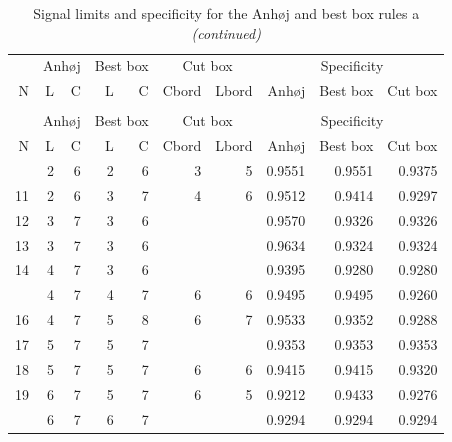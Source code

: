 \begin{Schunk}

\begin{longtable}{rrrrrrrrrr}
\caption{\label{tab:tab1}Signal limits and specificity for the Anhøj and best box rules and 
        borders for the cut box rules. N = number of data points in chart.
        L = upper limit for longest run, C = lower limit for number of 
        crossings, Cbord and Lbord = cut box borders to keep.}\\
\toprule
\multicolumn{1}{c}{ } & \multicolumn{2}{c}{Anhøj} & \multicolumn{2}{c}{Best box} & \multicolumn{2}{c}{Cut box} & \multicolumn{3}{c}{Specificity} \\
\cmidrule(l{3pt}r{3pt}){2-3} \cmidrule(l{3pt}r{3pt}){4-5} \cmidrule(l{3pt}r{3pt}){6-7} \cmidrule(l{3pt}r{3pt}){8-10}
N & L & C & L & C & Cbord & Lbord & Anhøj & Best box & Cut box\\
\midrule
\endfirsthead
\caption[]{Signal limits and specificity for the Anhøj and best box rules a \textit{(continued)}}\\
\toprule
\multicolumn{1}{c}{ } & \multicolumn{2}{c}{Anhøj} & \multicolumn{2}{c}{Best box} & \multicolumn{2}{c}{Cut box} & \multicolumn{3}{c}{Specificity} \\
\cmidrule(l{3pt}r{3pt}){2-3} \cmidrule(l{3pt}r{3pt}){4-5} \cmidrule(l{3pt}r{3pt}){6-7} \cmidrule(l{3pt}r{3pt}){8-10}
N & L & C & L & C & Cbord & Lbord & Anhøj & Best box & Cut box\\
\midrule
\endhead
\
\endfoot
\bottomrule
\endlastfoot
10 & 2 & 6 & 2 & 6 & 3 & 5 & 0.9551 & 0.9551 & 0.9375\\
11 & 2 & 6 & 3 & 7 & 4 & 6 & 0.9512 & 0.9414 & 0.9297\\
12 & 3 & 7 & 3 & 6 &  &  & 0.9570 & 0.9326 & 0.9326\\
13 & 3 & 7 & 3 & 6 &  &  & 0.9634 & 0.9324 & 0.9324\\
14 & 4 & 7 & 3 & 6 &  &  & 0.9395 & 0.9280 & 0.9280\\
\addlinespace
15 & 4 & 7 & 4 & 7 & 6 & 6 & 0.9495 & 0.9495 & 0.9260\\
16 & 4 & 7 & 5 & 8 & 6 & 7 & 0.9533 & 0.9352 & 0.9288\\
17 & 5 & 7 & 5 & 7 &  &  & 0.9353 & 0.9353 & 0.9353\\
18 & 5 & 7 & 5 & 7 & 6 & 6 & 0.9415 & 0.9415 & 0.9320\\
19 & 6 & 7 & 5 & 7 & 6 & 5 & 0.9212 & 0.9433 & 0.9276\\
\addlinespace
20 & 6 & 7 & 6 & 7 &  &  & 0.9294 & 0.9294 & 0.9294\\

\end{longtable}
\end{Schunk}
